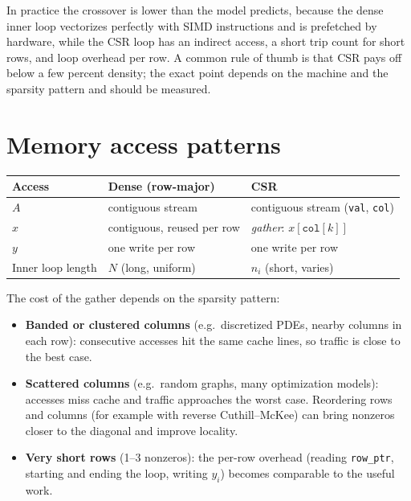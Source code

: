 \documentclass[11pt,a4paper]{article}
\newcommand{\id}[1]{\texttt{#1}}
\begin{document}
\noindent In practice the crossover is lower than the model predicts, because
the dense inner loop vectorizes perfectly with SIMD instructions and is
prefetched by hardware, while the CSR loop has an indirect access, a short
trip count for short rows, and loop overhead per row. A common rule of thumb
is that CSR pays off below a few percent density; the exact point depends on
the machine and the sparsity pattern and should be measured.

\section{Memory access patterns}

\begin{center}
\begin{tabular}{lll}
\toprule
Access & Dense (row-major) & CSR \\
\midrule
$A$ & contiguous stream & contiguous stream (\id{val}, \id{col}) \\
$x$ & contiguous, reused per row & \emph{gather}: $x[\id{col}[k]]$ \\
$y$ & one write per row & one write per row \\
Inner loop length & $N$ (long, uniform) & $n_i$ (short, varies) \\
\bottomrule
\end{tabular}
\end{center}

\noindent The cost of the gather depends on the sparsity pattern:
\begin{itemize}
  \item \textbf{Banded or clustered columns} (e.g.\ discretized PDEs,
        nearby columns in each row): consecutive accesses hit the same cache
        lines, so traffic is close to the best case.
  \item \textbf{Scattered columns} (e.g.\ random graphs, many optimization
        models): accesses miss cache and traffic approaches the worst case.
        Reordering rows and columns (for example with reverse Cuthill--McKee)
        can bring nonzeros closer to the diagonal and improve locality.
  \item \textbf{Very short rows} (1--3 nonzeros): the per-row overhead
        (reading \id{row\_ptr}, starting and ending the loop, writing $y_i$)
        becomes comparable to the useful work.
\end{itemize}
\end{document}
